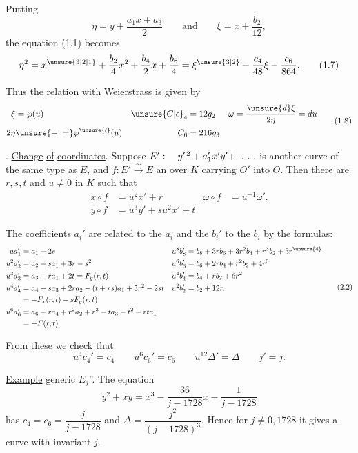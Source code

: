 Putting
\[
\eta=y+\frac{a_1x+a_3}{2}\qquad\text{and}\qquad
\xi=x+\frac{b_2}{12},
\tag*{(1.6)}
\]
the equation (1.1) becomes
\[
\eta^2=x^{\unsure{3|2|1}}+\frac{b_2}{4}x^2+\frac{b_4}{2}x+\frac{b_6}{4}
=\xi^{\unsure{3|2}}-\frac{c_4}{48}\xi-\frac{c_6}{864}.
\tag*{(1.7)}
\]

Thus the relation with Weierstrass is given by
\[
\begin{aligned}
\xi&=\wp(u) & {\unsure{C|c}}_4&=12g_2 &
\omega&=\frac{\unsure{d}\xi}{2\eta}=du\\
2\eta&\unsure{-|=}\wp^{\unsure{\prime}}(u) & C_6&=216g_3
\end{aligned}
\tag*{(1.8)}
\]
\endgroup

\begingroup
\makeatletter\tagsleft@true{}. \uline{Change} \uline{of} \uline{coordinates}. Suppose $E':\quad y^{\prime\,2}+a_1'x'y'+\ldotp\,\ldotp\,\ldotp\,\ldotp$ is another curve of the same type as $E$, and $f:E'\overset{\sim}{\longrightarrow}E$ an  over $K$ carrying $O'$ into $O$. Then there are $r,s,t$ and $u\ne0$ in $K$ such that
\[
\begin{aligned}
x\circ f&=u^2x'+r & \omega\circ f&=u^{-1}\omega'.\\
y\circ f&=u^3y'+su^2x'+t
\end{aligned}
\tag*{(2.1)}
\]

The coefficients $a_i'$ are related to the $a_i$  and the $b_i'$ to the $b_i$ by the formulas:
\begingroup\scriptsize
\[
\begin{aligned}
ua_1'&=a_1+2s & u^8b_8'&=b_8+3rb_6+3r^2b_4+r^3b_2+3r^{\unsure{4}}\\
u^2a_2'&=a_2-sa_1+3r-s^2 & u^6b_6'&=b_6+2rb_4+r^2b_2+4r^3\\
u^3a_3'&=a_3+ra_1+2t=F_y(r,t) & u^4b_4'&=b_4+rb_2+6r^2\\
u^4a_4'&=a_4-sa_3+2ra_2-(t+rs)a_1+3r^2-2st
 & u^2b_2'&=b_2+12r.\\
 &= -F_x(r,t)-sF_y(r,t)\\
u^6a_6'&=a_6+ra_4+r^2a_2+r^3-ta_3-t^2-rta_1\\
 &= -F(r,t)
\end{aligned}
\tag*{(2.2)}
\]
\endgroup

From these we check that:
\[
u^4c_4'=c_4\qquad u^6c_6'=c_6\qquad
u^{12}\Delta'=\Delta\qquad j'=j.
\tag*{(2.3)}
\]

\uline{Example} generic $E_j$''. The equation
\[
y^2+xy=x^3-\frac{36}{j-1728}x-\frac{1}{j-1728}
\tag*{(2.4)}
\]
has $c_4=c_6=\dfrac{j}{j-1728}$ and $\Delta=\dfrac{j^2}{(j-1728)^3}$. Hence for $j\ne0,1728$ it gives a curve with invariant $j$.


